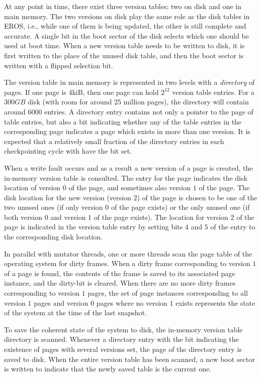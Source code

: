 At any point in time, there exist three version tables; two on disk
and one in main memory.  The two versions on disk play the same role
as the disk tables in EROS, i.e., while one of them is being updated,
the other is still complete and accurate.  A single bit in the boot
sector of the disk selects which one should be used at boot time.
When a new version table needs to be written to disk, it is first
written to the place of the unused disk table, and then the boot
sector is written with a flipped selection bit. 

The version table in main memory is represented in two levels with a
\emph{directory} of pages.  If one page is 4kiB, then one page can
hold $2^{12}$ version table entries.  For a $300GB$ disk (with room
for around $25$ million pages), the directory will contain around
$6000$ entries.  A directory entry contains not only a pointer to the
page of table entries, but also a bit indicating whether any of the
table entries in the corresponding page indicates a page which exists
in more than one version.  It is expected that a relatively small
fraction of the directory entries in each checkpointing cycle with
have the bit set.

When a write fault occurs and as a result a new version of a page is
created, the in-memory version table is consulted.  The entry for the
page indicates the disk location of version $0$ of the page, and
sometimes also version $1$ of the page.  The disk location for the new
version (version $2$) of the page is chosen to be one of the two
unused ones (if only version $0$ of the page exists) or the only
unused one (if both version $0$ and version $1$ of the page exists).
The location for version $2$ of the page is indicated in the version
table entry by setting bits $4$ and $5$ of the entry to the
corresponding disk location. 

In parallel with mutator threads, one or more threads scan the page
table of the operating system for dirty frames.  When a dirty frame
corresponding to version $1$ of a page is found, the contents of the
frame is saved to its associated page instance, and the dirty-bit is
cleared.  When there are no more dirty frames corresponding to version
$1$ pages, the set of page instances corresponding to all version $1$
pages and version $0$ pages where no version $1$ exists represents the
state of the system at the time of the last snapshot.  

To save the coherent state of the system to disk, the in-memory
version table directory is scanned.  Whenever a directory entry with
the bit indicating the existence of pages with several versions set,
the page of the directory entry is saved to disk.  When the entire
version table has been scanned, a new boot sector is written
to indicate that the newly saved table is the current one.


